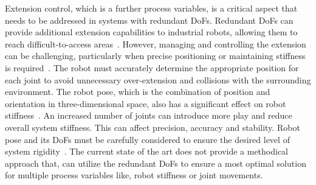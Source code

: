 Extension control, which is a further process variables, is a critical aspect that needs to be addressed in systems with redundant \acrshort{DoF}s. Redundant \acrshort{DoF}s can provide additional extension capabilities to industrial robots, allowing them to reach difficult-to-access areas~\cite{Duong.2021}. However, managing and controlling the extension can be challenging, particularly when precise positioning or maintaining stiffness is required~\cite{Lin.2022}.
The robot must accurately determine the appropriate position for each joint to avoid unnecessary over-extension and collisions with the surrounding environment. The robot pose, which is the combination of position and orientation in three-dimensional space, also has a significant effect on robot stiffness~\cite{Xiong.2019}. An increased number of joints can introduce more play and reduce overall system stiffness. This can affect precision, accuracy and stability. Robot pose and its \acrshort{DoF}s must be carefully considered to ensure the desired level of system rigidity~\cite{Wang.2022, Shi.2021}. The current state of the art does not provide a methodical approach that, can utilize the redundant \acrshort{DoF}s to ensure a most optimal solution for multiple process variables like, robot stiffness or joint movements.


